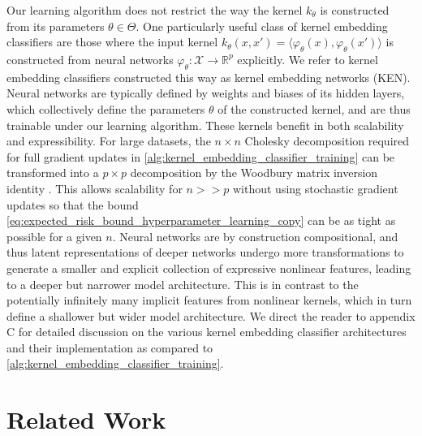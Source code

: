 \documentclass{article}
\begin{document}
	Our learning algorithm does not restrict the way the kernel $k_{\theta}$ is constructed from its parameters $\theta \in \Theta$. One particularly useful class of kernel embedding classifiers are those where the input kernel $k_{\theta}(x, x') = \langle \varphi_{\theta}(x), \varphi_{\theta}(x') \rangle$ is constructed from neural networks $\varphi_{\theta} : \mathcal{X} \to \mathbb{R}^{p}$ explicitly. We refer to kernel embedding classifiers constructed this way as kernel embedding networks (KEN). Neural networks are typically defined by weights and biases of its hidden layers, which collectively define the parameters $\theta$ of the constructed kernel, and are thus trainable under our learning algorithm. These kernels benefit in both scalability and expressibility. For large datasets, the $n \times n$ Cholesky decomposition required for full gradient updates in \cref{alg:kernel_embedding_classifier_training} can be transformed into a $p \times p$ decomposition by the Woodbury matrix inversion identity \citep{higham2002accuracy}. This allows scalability for $n >> p$ without using stochastic gradient updates so that the bound \eqref{eq:expected_risk_bound_hyperparameter_learning_copy} can be as tight as possible for a given $n$. Neural networks are by construction compositional, and thus latent representations of deeper networks undergo more transformations to generate a smaller and explicit collection of expressive nonlinear features, leading to a deeper but narrower model architecture. This is in contrast to the potentially infinitely many implicit features from nonlinear kernels, which in turn define a shallower but wider model architecture. We direct the reader to appendix C for detailed discussion on the various kernel embedding classifier architectures and their implementation as compared to \cref{alg:kernel_embedding_classifier_training}. 

\section{Related Work}
\label{sec:related_work}
\end{document}
